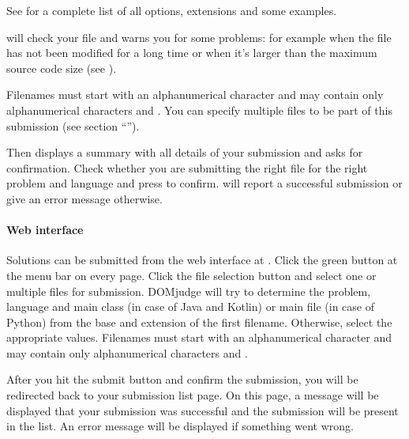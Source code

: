 \documentclass[a4paper,10pt,english,openany]{sphinxmanual}
\begin{document}
\sphinxAtStartPar
See  for a complete list of all options,
extensions and some examples.

\sphinxAtStartPar
{} will check your file and warns you for some problems:
for example when the file has not been modified for a long time or
when it’s larger than the maximum source code size
(see {\hyperref[\detokenize{team:runlimits}]{}}).

\sphinxAtStartPar
Filenames must start with an alphanumerical character and may contain only
alphanumerical characters and . You can specify multiple files
to be part of this submission (see section
“{\hyperref[\detokenize{team:judgingprocess}]{}}”).

\sphinxAtStartPar
Then  displays a summary with all details of your
submission and asks for confirmation. Check whether you are submitting
the right file for the right problem and language and press  to
confirm.  will report a successful submission or give
an error message otherwise.


\paragraph{Web interface}
\label{\detokenize{team:web-interface}}
\sphinxAtStartPar
Solutions can be submitted from the web interface at .
Click the green  button at the menu bar on every page.
Click the file selection button and select one or
multiple files for submission. DOMjudge will try to determine the
problem, language and main class (in case of Java and Kotlin) or main file
(in case of Python) from the base and extension of the first filename.
Otherwise, select the appropriate values.
Filenames must start with an alphanumerical character and may contain only
alphanumerical characters and .

\sphinxAtStartPar
After you hit the submit button and confirm the submission, you will
be redirected back to your submission list page. On this page, a message
will be displayed that your submission was successful and the
submission will be present in the list. An error message will be
displayed if something went wrong.
\end{document}
